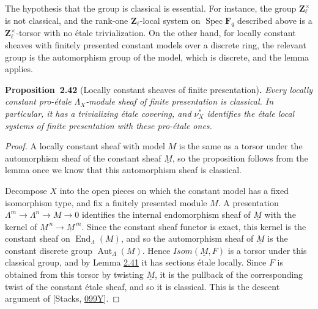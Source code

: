 \documentclass[11pt]{article}
\newenvironment{bpstatement}[2]{\par\addvspace{0.6\baselineskip}\noindent\textbf{#1}#2\textbf{.}\enspace\ignorespaces}
  {\par\addvspace{0.4\baselineskip}}
\newenvironment{bpstatementit}[2]{\begin{bpstatement}{#1}{#2}\itshape\ignorespaces}{\end{bpstatement}}
\begin{document}
\label{bp123}%
The hypothesis that the group is classical is essential. For instance, the group \(\mathbf Z_\ell^\times\) is not classical, and the rank-one \(\mathbf Z_\ell\)-local system on \(\operatorname{Spec}\mathbf F_q\) described above is a \(\mathbf Z_\ell^\times\)-torsor with no étale trivialization. On the other hand, for locally constant sheaves with finitely presented constant models over a discrete ring, the relevant group is the automorphism group of the model, which is discrete, and the lemma applies.

\label{bp124}%
\begin{bpstatementit}{Proposition~2.42}{ (Locally constant sheaves of finite presentation)}
Every locally constant pro-étale \(\Lambda_X\)-module sheaf of finite presentation is classical. In particular, it has a trivializing étale covering, and \(\nu_X^*\) identifies the étale local systems of finite presentation with these pro-étale ones.
\end{bpstatementit}

\begin{proof}[{Proof}]\label{bp125}%
A locally constant sheaf with model \(M\) is the same as a torsor under the automorphism sheaf of the constant sheaf \(\underline M\), so the proposition follows from the lemma once we know that this automorphism sheaf is classical.

Decompose \(X\) into the open pieces on which the constant model has a fixed isomorphism type, and fix a finitely presented module \(M\). A presentation \(\Lambda^m\to\Lambda^n\to M\to0\) identifies the internal endomorphism sheaf of \(\underline M\) with the kernel of \(\underline M^{\,n}\to\underline M^{\,m}\). Since the constant sheaf functor is exact, this kernel is the constant sheaf on \(\operatorname{End}_\Lambda(M)\), and so the automorphism sheaf of \(\underline M\) is the constant discrete group \(\operatorname{Aut}_\Lambda(M)\). Hence \(\mathit{Isom}(\underline M,F)\) is a torsor under this classical group, and by Lemma \hyperref[bp121]{2.41} it has sections étale locally. Since \(F\) is obtained from this torsor by twisting \(\underline M\), it is the pullback of the corresponding twist of the constant étale sheaf, and so it is classical. This is the descent argument of [Stacks, \href{https://stacks.math.columbia.edu/tag/099Y}{099Y}].
\end{proof}
\end{document}
